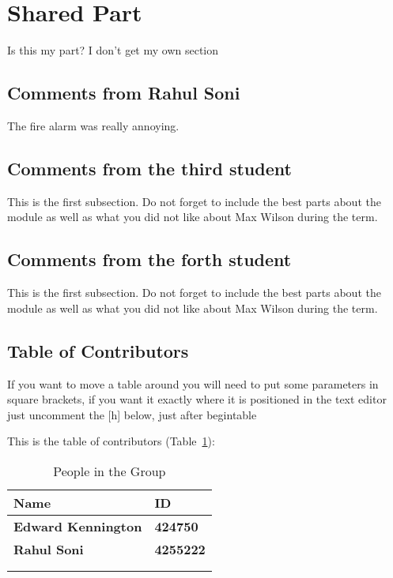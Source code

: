 \section{Shared Part}

Is this my part? I don't get my own section



\subsection{Comments from Rahul Soni}
The fire alarm was really annoying.

\subsection{Comments from the third student}
This is the first subsection. Do not forget to include the best parts about the module as well as what you did not like about Max Wilson during the term.

\subsection{Comments from the forth student}
This is the first subsection. Do not forget to include the best parts about the module as well as what you did not like about Max Wilson during the term.

\subsection{Table of Contributors}


If you want to move a table around you will need to put some parameters in square brackets, if you want it exactly where it is positioned in the text editor just uncomment the [h] below, just after begin{table}

This is the table of contributors (Table~\ref{authors}):
\begin{table}%
\centering
\caption{People in the Group}
\label{authors}
\begin{tabular}{|l|l|}
\hline
\textbf{Name} & \textbf{ID} \\
\hline
\textbf{Edward Kennington}& \textbf{424750}\\
\hline
\textbf{Rahul Soni} & \textbf{4255222} \\
\hline
& \\
\hline
& \\
\hline
\end{tabular}
\end{table}